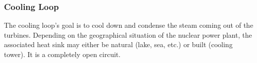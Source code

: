 %
%
%
%
%
%


\subsubsection{Cooling Loop}


The cooling loop's goal is to cool down and condense the steam coming out of the turbines. Depending on the geographical situation of the nuclear power plant, the associated heat sink may either be natural (lake, sea, etc.) or built (cooling tower). It is a completely open circuit.

%
%
%
%
%
%


